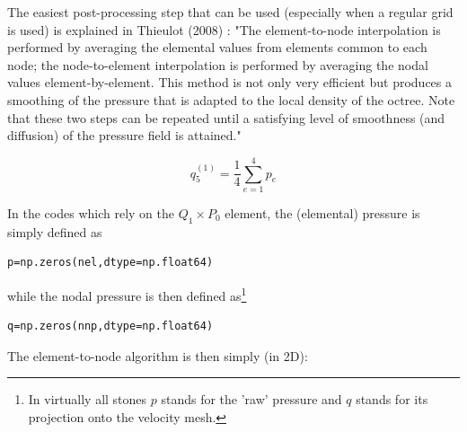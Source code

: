 The easiest post-processing step that can be used (especially when a regular grid is used) 
is explained in Thieulot \etal (2008) \cite{thfb08}: "The element-to-node interpolation is performed by
averaging the elemental values from elements common to each node; 
the node-to-element interpolation is performed
by averaging the nodal values element-by-element. This
method is not only very efficient but produces a smoothing
of the pressure that is adapted to the local density of the
octree. Note that these two steps can be repeated until a
satisfying level of smoothness (and diffusion) of the pressure field is attained."


\begin{center}
\end{center}
\[
q_5^{(1)} = \frac{1}{4}\sum_{e=1}^4 p_e
\] 

In the codes which rely on the $Q_1 \times P_0$ element, the (elemental) pressure
is simply defined as 
\begin{lstlisting}
p=np.zeros(nel,dtype=np.float64)  
\end{lstlisting}
while the nodal pressure is then defined as\footnote{In virtually all stones $p$
stands for the 'raw' pressure and $q$ stands for its projection onto the velocity mesh.} 
\begin{lstlisting}
q=np.zeros(nnp,dtype=np.float64)  
\end{lstlisting}
The element-to-node algorithm is then simply (in 2D):

